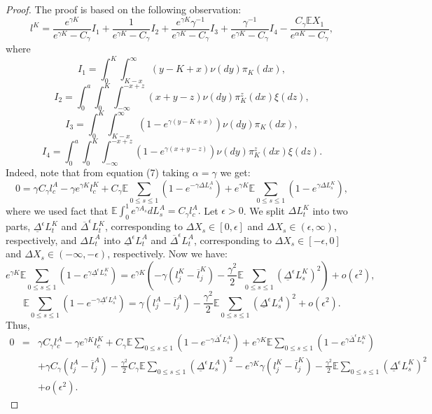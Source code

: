 \documentclass{aptpub}
\begin{document}
\begin{proof}
The proof is based on the following observation:
\begin{equation}\label{newreplK}
l^K=\frac{e^{\gamma K}}{e^{\gamma K}-C_\gamma}I_1+\frac{1}{e^{\gamma K}-C_\gamma}I_2+\frac{e^{\gamma K}\gamma^{-1}}{e^{\gamma K}-C_\gamma}I_3+\frac{\gamma^{-1}}{e^{\gamma K}-C_\gamma}I_4-\frac{C_\gamma\mathbb{E}X_1}{e^{\alpha K}-C_\gamma},\end{equation}
where
$$I_1=\int_0^K\int_{K-x}^\infty (y-K+x)\nu(dy)\pi_K(dx),$$
$$I_2=\int_0^a\int_0^K\int_{-\infty}^{-x+z} (x+y-z)\nu(dy)\pi_K^z(dx)\xi(dz),$$
$$I_3=\int_0^K\int_{K-x}^\infty (1-e^{\gamma(y-K+x)})\nu(dy)\pi_K(dx),$$
$$I_4=\int_0^a\int_0^K\int_{-\infty}^{-x+z} (1-e^{\gamma(x+y-z)})\nu(dy)\pi_K^z(dx)\xi(dz).$$
Indeed,
note that from equation (7) taking $\alpha=\gamma$ we get:
$$0=\gamma C_\gamma l_c^A-\gamma e^{\gamma K}l_c^K+C_\gamma\mathbb{E}\sum_{0\leq s\leq 1}(1-e^{-\gamma\Delta L_s^A})+e^{\gamma K}\mathbb{E}\sum_{0\leq s\leq 1}(1-e^{\gamma\Delta L_s^K}),$$
where we used fact that $\mathbb{E}\int_0^1e^{\gamma A_s}dL_s^A=C_\gamma l_c^A.$
Let $\epsilon >0$. We split $\Delta L_t^K$ into two parts, $\underline{\Delta}^\epsilon L_t^K$ and $\overline{\Delta}^\epsilon L_t^K$, corresponding to $\Delta X_s\in[0,\epsilon]$ and $\Delta X_s\in(\epsilon,\infty)$, respectively, and $\Delta L_t^A$ into  $\underline{\Delta}^\epsilon L_t^A$ and $\overline{\Delta}^\epsilon L_t^A$, corresponding to $\Delta X_s\in[-\epsilon,0]$ and $\Delta X_s\in(-\infty,-\epsilon)$, respectively.
Now we have:
$$e^{\gamma K}\mathbb{E}\sum_{0\leq s\leq 1}(1-e^{\gamma\underline{\Delta}^\epsilon L_s^K})=e^{\gamma K}\left(-\gamma (l_j^K-\overline{l}_j^K)-\frac{\gamma^2}{2}\mathbb{E}\sum_{0\leq s\leq 1}(\underline{\Delta}^\epsilon L_s^K)^2\right)+o(\epsilon^2),$$
$$\mathbb{E}\sum_{0\leq s\leq 1}(1-e^{-\gamma\underline{\Delta}^\epsilon L_s^A})=\gamma (l_j^A-\overline{l}_j^A)-\frac{\gamma^2}{2}\mathbb{E}\sum_{0\leq s\leq 1}(\underline{\Delta}^\epsilon L_s^A)^2+o(\epsilon^2).$$
Thus,
\begin{eqnarray*}
0&=&\gamma C_\gamma l_c^A-\gamma e^{\gamma K}l_c^K+C_\gamma\mathbb{E}\sum_{0\leq s\leq 1}(1-e^{-\gamma\overline{\Delta}^\epsilon L_s^A})+e^{\gamma K}\mathbb{E}\sum_{0\leq s\leq 1}(1-e^{\gamma\overline{\Delta}^\epsilon L_s^K})\\
&&+\gamma C_\gamma(l_j^A-\overline{l}_j^A)-\frac{\gamma^2}{2}C_\gamma\mathbb{E}\sum_{0\leq s\leq 1}(\underline{\Delta}^\epsilon L_s^A)^2-e^{\gamma K}\gamma(l_j^K-\overline{l}_j^K)-\frac{\gamma^2}{2}\mathbb{E}\sum_{0\leq s\leq 1}(\underline{\Delta}^\epsilon L_s^K)^2\\ &&+o(\epsilon^2).

\end{eqnarray*}
\end{proof}
\end{document}
